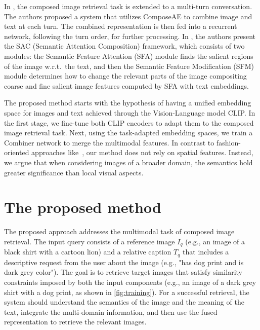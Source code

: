\documentclass[acmlarge]{acmart}
\begin{document}
In \cite{yuan-2021-conversational}, the composed image retrieval task is extended to a multi-turn conversation. The authors proposed a system that utilizes ComposeAE \cite{Anwaar_2021_WACV} to combine image and text at each turn. The combined representation is then fed into a recurrent network, following the turn order, for further processing.
In \cite{Jandial_2022_WACV}, the authors present the SAC (Semantic Attention Composition) framework, which consists of two modules: the Semantic Feature Attention (SFA) module finds the salient regions of the image w.r.t.~the text, and then the Semantic Feature Modification (SFM) module determines how to change the relevant parts of the image compositing coarse and fine salient image features computed by SFA with text embeddings.

The proposed method starts with the hypothesis of having a unified embedding space for images and text achieved through the Vision-Language model CLIP. In the first stage, we fine-tune both CLIP encoders to adapt them to the composed image retrieval task. Next, using the task-adapted embedding spaces, we train a Combiner network to merge the multimodal features. In contrast to fashion-oriented approaches like~\cite{Chen_2020_CVPR, Lee_2021_CVPR}, our method does not rely on spatial features. Instead, we argue that when considering images of a broader domain, the semantics hold greater significance than local visual aspects.




\section{The proposed method}\label{sec:method}
The proposed approach addresses the multimodal task of composed image retrieval. The input query consists of a reference image $I_q$ (e.g., an image of a black shirt with a cartoon lion) and a relative caption $T_q$ that includes a descriptive request from the user about the image (e.g., "has dog print and is dark grey color"). The goal is to retrieve target images that satisfy similarity constraints imposed by both the input components (e.g., an image of a dark grey shirt with a dog print, as shown in \cref{fig:training}). For a successful retrieval, the system should understand the semantics of the image and the meaning of the text, integrate the multi-domain information, and then use the fused representation to retrieve the relevant images.
\end{document}
